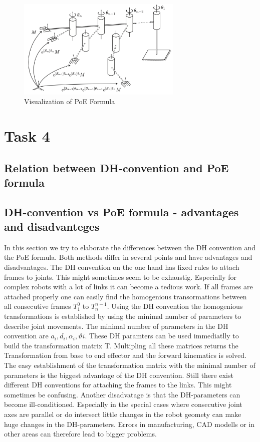 \documentclass{tpk4170report}
\begin{document}
\begin{figure}
  \centering
  \includegraphics[width=0.7\textwidth]{assets/PoE_Visualization.pdf} 
  \caption{Visualization of PoE Formula}
  \label{fig:PoE_Visualization}
\end{figure}

\section{Task 4}

\subsection{Relation between DH-convention and PoE formula}
\subsection{DH-convention vs PoE formula - advantages and disadvanteges}
In this section we try to elaborate the differences between the DH convention and the PoE formula. Both methods differ in several points and have advantages and disadvantages. The DH convention on the one hand has fixed rules to attach frames to joints. This might sometimes seem to be exhaustig. Especially for complex robots with a lot of links it can become a tedious work. If all frames are attached properly one can easily find the homogenious transormations between all consecutive frames \(T_{1}^{0}\) to \(T_{n}^{n-1}\). Using the DH convention the homogenious transformations is established by using the minimal number of parameters to describe joint movements. The minimal number of parameters in the DH convention are  \(a_{i}, d_{i}, \alpha_{i}, \vartheta{i}\). These DH paramters can be used immediatlly to build the transformation matrix T. Multipling all these matrices returns the Transformation from base to end effector and the forward kinematics is solved. The easy establishment of the transformation matrix with the minimal number of parameters is the biggest advantage of the DH convention. Still there exist different DH conventions for attaching the frames to the links. This might sometimes be confusing. Another disadvatage is that the DH-parameters can become ill-conditioned. Especially in the special cases where consecutive joint axes are parallel or do intersect little changes in the robot geomety can make huge changes in the DH-parameters. Errors in manufacturing, CAD modells or in other areas can therefore lead to bigger problems. 
\end{document}
